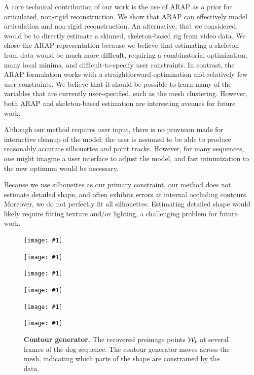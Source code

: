 \documentclass[preprint]{acmsiggraph}
\begin{document}
A core technical contribution of our work is the use of ARAP as a prior
for articulated, non-rigid reconstruction. We show that ARAP can effectively model
articulation and non-rigid reconstruction. An alternative, that we
considered, would be to directly estimate a skinned, skeleton-based
rig from video data.
We chose the ARAP representation because we
believe that estimating a skeleton from data would be much more
difficult, requiring a combinatorial optimization, many local minima,
and difficult-to-specify user constraints. In contrast, the ARAP
formulation works with a straightforward optimization and relatively
few user constraints. We believe that it should be possible to learn
many of the variables that are currently user-specified, such as the
mesh clustering. However, both ARAP
and skeleton-based estimation are interesting avenues for future work.

Although our method requires user input, there is no provision made for interactive cleanup of the model: the user is assumed to be able to produce reasonably accurate silhouettes and point tracks.  However, for many sequences, one might imagine a user interface to adjust the model, and fast minimization to the new optimum would be necessary.

Because we use silhouettes as our primary constraint, our method does
not estimate detailed shape, and often exhibits errors at internal
occluding contours. Moreover, we do not perfectly fit all
silhouettes. Estimating detailed shape would likely require fitting
texture and/or lighting, a challenging problem for future work. 


\begin{figure}
\setlength{\awfw}{0.16\linewidth}
\setlength{\fboxsep}{0pt}%
\setlength{\fboxrule}{1pt}%
\def\awfig#1{{\texttt{[image: \#1]}}}
\def\awfp#1{%
\parbox{\awfw}{%
\awfig{vid/dog0/Boxer_0F_DOC_Cropped/#1/1.png}}}
\awfp{113}%
\awfp{133}%
\awfp{145}%
\awfp{151}%
\awfp{166}%
\awfp{176}%
\caption{\textbf{Contour generator.}  The recovered preimage points $\mathcal{W}_t$ at several frames of the dog sequence.  The contour generator moves across the mesh, indicating which parts of the shape are constrained by the data.}
\label{fig:cg}
\end{figure}



\end{document}
